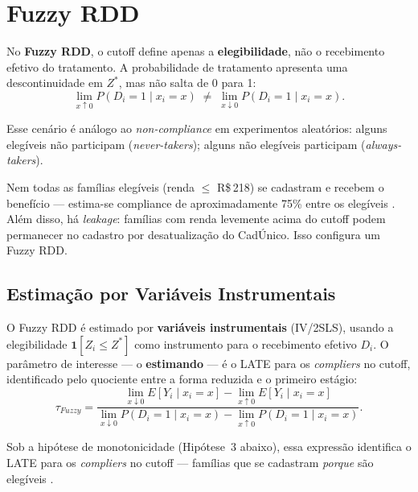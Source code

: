 \documentclass[12pt, a4paper, openany]{book}
\begin{document}
\chapter{Fuzzy RDD}
\label{sec:fuzzy}

No \textbf{Fuzzy RDD}, o cutoff define apenas a \textbf{elegibilidade}, n\~ao o recebimento efetivo do tratamento. A probabilidade de tratamento apresenta uma descontinuidade em $Z^*$, mas n\~ao salta de 0 para 1:
\begin{equation}
  \lim_{x \uparrow 0} P(D_i = 1 \mid x_i = x) \;\neq\; \lim_{x \downarrow 0} P(D_i = 1 \mid x_i = x).
\end{equation}

Esse cen\'ario \'e an\'alogo ao \textit{non-compliance} em experimentos aleat\'orios: alguns eleg\'iveis n\~ao participam (\textit{never-takers}); alguns n\~ao eleg\'iveis participam (\textit{always-takers}).

\begin{exemplobox}
Nem todas as fam\'ilias eleg\'iveis (renda $\leq$ R\$\,218) se cadastram e recebem o benef\'icio --- estima-se compliance de aproximadamente 75\% entre os eleg\'iveis \citep{Ribeiro2017}. Al\'em disso, h\'a \textit{leakage}: fam\'ilias com renda levemente acima do cutoff podem permanecer no cadastro por desatualiza\c{c}\~ao do Cad\'Unico. Isso configura um Fuzzy RDD.
\end{exemplobox}

\section{Estima\c{c}\~ao por Vari\'aveis Instrumentais}

O Fuzzy RDD \'e estimado por \textbf{vari\'aveis instrumentais} (IV/2SLS), usando a elegibilidade $\mathbf{1}[Z_i \leq Z^*]$ como instrumento para o recebimento efetivo $D_i$. O par\^ametro de interesse --- o \textbf{estimando} --- \'e o LATE para os \textit{compliers} no cutoff, identificado pelo quociente entre a forma reduzida e o primeiro est\'agio:
\begin{equation}
  \tau_{Fuzzy} =
  \frac{
    \lim_{x \downarrow 0} E[Y_i \mid x_i = x] - \lim_{x \uparrow 0} E[Y_i \mid x_i = x]
  }{
    \lim_{x \downarrow 0} P(D_i=1 \mid x_i=x) - \lim_{x \uparrow 0} P(D_i=1 \mid x_i=x)
  }.
\end{equation}

Sob a hip\'otese de monotonicidade (Hip\'otese~3 abaixo), essa express\~ao identifica o LATE para os \textit{compliers} no cutoff --- fam\'ilias que se cadastram \textit{porque} s\~ao eleg\'iveis \citep{Hahn2001}.
\end{document}
